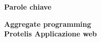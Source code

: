 \clearemptydoublepage{}
\thispagestyle{empty}
\vspace*{20ex}
\begin{flushright}
    \begin{LARGE}
        \textbf{Parole chiave}\\
        \vspace{5ex}
    \end{LARGE}
    \begin{normalsize}
        \textbf{%
            Aggregate programming\\%
            \medskip
            Protelis%
            \medskip
            Applicazione web
        }
    \end{normalsize}
\end{flushright}
\vfill
